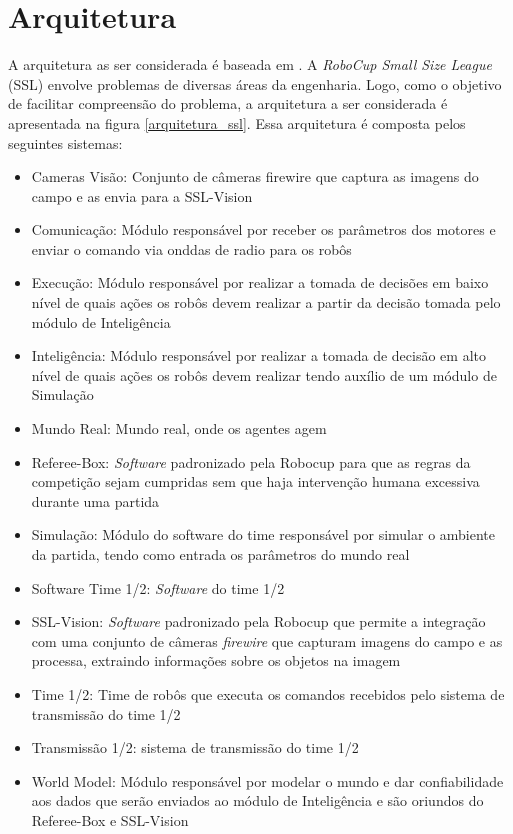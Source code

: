 \section{Arquitetura}

A arquitetura as ser considerada é baseada em \cite{felixnavarro}.
A \textit{RoboCup Small Size League} (SSL) envolve problemas de diversas áreas
da engenharia. Logo, como o objetivo de facilitar compreensão do
problema, a arquitetura a ser considerada é apresentada na figura
\ref{arquitetura_ssl}. Essa arquitetura é composta pelos seguintes
sistemas:

\begin{itemize}
  \item Cameras Visão: Conjunto de câmeras firewire que captura as imagens do
        campo e as envia para a SSL-Vision
  \item Comunicação: Módulo responsável por receber os parâmetros
        dos motores e enviar o comando via onddas de radio para os
        robôs
  \item Execução: Módulo responsável por realizar a tomada de decisões
        em baixo nível de quais ações os robôs devem realizar a partir
        da decisão tomada pelo módulo de Inteligência
  \item Inteligência: Módulo responsável por realizar a tomada de
        decisão em alto nível de quais ações os robôs devem realizar 
        tendo auxílio de um módulo de Simulação
  \item Mundo Real: Mundo real, onde os agentes agem
  \item Referee-Box: \textit{Software} padronizado pela Robocup para que as
        regras da competição sejam cumpridas sem que haja intervenção
        humana excessiva durante uma partida
  \item Simulação: Módulo do software do time responsável por simular
        o ambiente da partida, tendo como entrada os parâmetros do mundo
        real
  \item Software Time 1/2: \textit{Software} do time 1/2
  \item SSL-Vision: \textit{Software} padronizado pela Robocup que permite a
        integração com uma conjunto de câmeras \textit{firewire} que capturam 
        imagens do campo e as processa, extraindo informações sobre os objetos na
        imagem
  \item Time 1/2: Time de robôs que executa os comandos recebidos pelo
        sistema de transmissão do time 1/2
  \item Transmissão 1/2: sistema de transmissão do time 1/2
  \item World Model: Módulo responsável por modelar o mundo e dar
        confiabilidade aos dados que serão enviados ao módulo de
        Inteligência e são oriundos do Referee-Box e SSL-Vision
\end{itemize}

